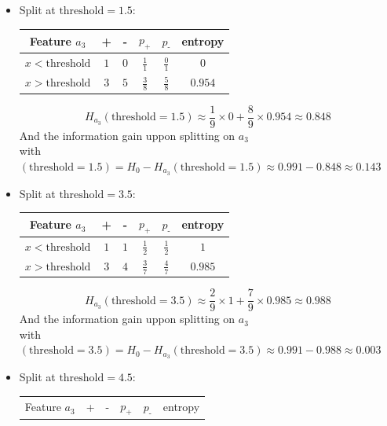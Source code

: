\documentclass[a4paper, 10pt]{article}
\begin{document}
\begin{itemize}[label=$\square$]
    \item Split at $\text{threshold}=1.5$:
    \begin{center}
        \begin{tabular}{ |c|c|c|c|c|c| }
            \hline
            Feature $a_3$           & +      & -     & $p_\text{+}$ & $p_\text{-}$  & entropy\\
            \hline
            $x<\text{threshold}$    & $1$    & $0$   & $\frac{1}{1}$ & $\frac{0}{1}$    & $0$\\
            \hline
            $x>\text{threshold}$    & $3$    & $5$   & $\frac{3}{8}$ & $\frac{5}{8} $   & $0.954$\\
            \hline
        \end{tabular}
    \end{center}
    $$
    H_{a_3}(\text{threshold}=1.5) \approx \frac{1}{9}\times0 + \frac{8}{9}\times0.954 \approx 0.848
    $$
    And the information gain uppon splitting on $a_3$ \\with $(\text{threshold}=1.5)= H_0 -H_{a_3}(\text{threshold}=1.5) \approx 0.991 - 0.848 \approx 0.143$
    \item Split at $\text{threshold}=3.5$:
    \begin{center}
        \begin{tabular}{ |c|c|c|c|c|c| }
            \hline
            Feature $a_3$           & +      & -     & $p_\text{+}$ & $p_\text{-}$  & entropy\\
            \hline
            $x<\text{threshold}$    & $1$    & $1$   & $\frac{1}{2}$ & $\frac{1}{2}$    & $1$\\
            \hline
            $x>\text{threshold}$    & $3$    & $4$   & $\frac{3}{7}$ & $\frac{4}{7} $   & $0.985$\\
            \hline
        \end{tabular}
    \end{center}
    $$
    H_{a_3}(\text{threshold}=3.5) \approx \frac{2}{9}\times1 + \frac{7}{9}\times0.985 \approx 0.988
    $$
    And the information gain uppon splitting on $a_3$ \\with $(\text{threshold}=3.5)= H_0 -H_{a_3}(\text{threshold}=3.5) \approx 0.991 - 0.988 \approx 0.003$
    \item Split at $\text{threshold}=4.5$:
    \begin{center}
        \begin{tabular}{ |c|c|c|c|c|c| }
            \hline
            Feature $a_3$           & +      & -     & $p_\text{+}$ & $p_\text{-}$  & entropy\\

\end{tabular}
\end{center}
\end{itemize}
\end{document}

